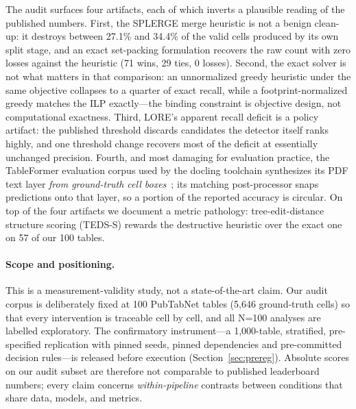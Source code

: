 \documentclass[final,5p,times,twocolumn]{elsarticle}
\begin{document}
The audit surfaces four artifacts, each of which inverts a plausible reading
of the published numbers. First, the SPLERGE merge heuristic is not a benign
clean-up: it destroys between 27.1\% and 34.4\% of the valid cells produced by
its own split stage, and an exact set-packing formulation recovers the raw
count with zero losses against the heuristic (71 wins, 29 ties, 0 losses).
Second, the exact solver is not what matters in that comparison: an
unnormalized greedy heuristic under the same objective collapses to a quarter
of exact recall, while a footprint-normalized greedy matches the ILP
exactly---the binding constraint is objective design, not computational
exactness. Third, LORE's apparent recall deficit is a policy artifact: the
published threshold discards candidates the detector itself ranks highly, and
one threshold change recovers most of the deficit at essentially unchanged
precision. Fourth, and most damaging for
evaluation practice, the TableFormer evaluation corpus used by the docling
toolchain synthesizes its PDF text layer \emph{from ground-truth cell
boxes}~\cite{auer2024docling}; its matching post-processor snaps predictions
onto that layer, so a portion of the reported accuracy is circular. On top of
the four artifacts we document a metric pathology: tree-edit-distance
structure scoring (TEDS-S) rewards the destructive heuristic over the exact
one on 57 of our 100 tables.

\paragraph{Scope and positioning.} This is a measurement-validity study, not a
state-of-the-art claim. Our audit corpus is deliberately fixed at 100
PubTabNet tables (5{,}646 ground-truth cells) so that every intervention is
traceable cell by cell, and all N=100 analyses are labelled exploratory. The
confirmatory instrument---a 1{,}000-table, stratified, pre-specified
replication with pinned seeds, pinned dependencies and pre-committed decision
rules---is released before execution (Section~\ref{sec:prereg}). Absolute scores on our audit subset are therefore
not comparable to published leaderboard numbers; every claim concerns
\emph{within-pipeline} contrasts between conditions that share data, models,
and metrics.
\end{document}
